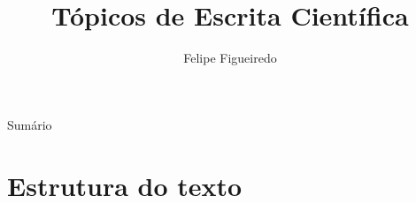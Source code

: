 \documentclass{beamer}
\title%
{Tópicos de Escrita Científica}
\subtitle
{} %
\author%
{Felipe Figueiredo}%
\institute[INTO] %
{Instituto Nacional de Traumatologia e Ortopedia
}
\date%
{}
\begin{document}
\begin{frame}
  \titlepage
\end{frame}

\begin{frame}{Sumário}
  \tableofcontents
\end{frame}








\section{Estrutura do texto}
\end{document}
